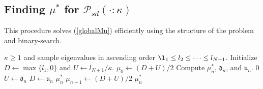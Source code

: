 \documentclass[11pt]{article}
\newcommand{\COR}{\text{COR}}
\newcommand{\bLambda}{\boldsymbol{\lambda}}
\newcommand{\E}{\mathbb{E}}
\theoremstyle{definition}
\theoremstyle{definition}
\def\one{{\bf 1}}
\def\bSigma{{\bf \Sigma}}
\def\bLambda{{\bf \Lambda}}
\def\v{{\bf v}}
\def\V{{\bf V}}
\def\E{{\mathbb E}}
\def\conv{\text{conv}}
\begin{document}


\subsection{Finding $\mu^*$ for $\mathcal{P}_{sd}(\cdot : \kappa)$} 
 \begin{algorithm}[t!]
\caption{This procedure solves (\ref{globalMu}) efficiently using the structure of the problem and binary-search.} 
\label{projSD_algo}
\begin{algorithmic}[1]
\Require $\kappa \geq 1$ and sample eigenvalues in ascending order $\l_1 \leq l_2 \leq \dots \leq l_{N+1}$.
\State Initialize $D \leftarrow \max\{l_1,0\}$ and  $U \leftarrow l_{N+1}/\kappa$.
\State $\mu_0 \leftarrow (D + U)/2$
\State Compute $\mu_n^*$, $\mathfrak{d}_n$, and $\mathfrak{u}_n$. 
\State \Return $0$ 
\State $U \leftarrow \mathfrak{d}_n$
\State $D \leftarrow \mathfrak{u}_n$
\Else 
\State \Return $\mu_n^*$
\EndIf
\State $\mu_{n+1} \leftarrow (D + U)/2$
\EndFor
\State \Return $\mu_n^*$
\EndProcedure
\end{algorithmic}
\label{algo}
\end{algorithm}
\end{document}
